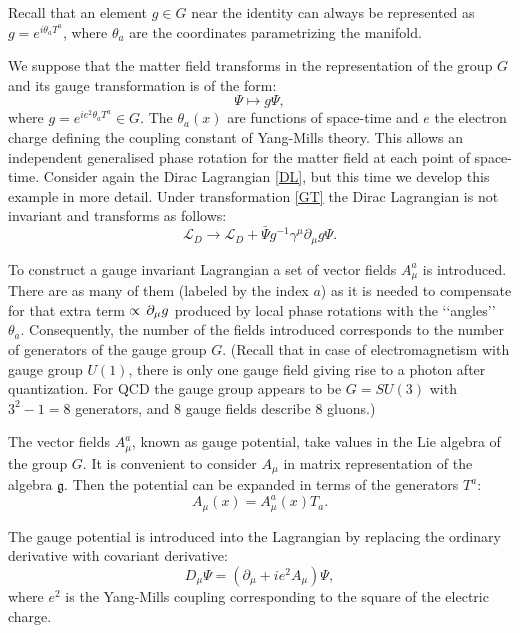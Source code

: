 \documentclass[11pt]{report}
\theoremstyle{plain}
\theoremstyle{definition}
\theoremstyle{remark}
\theoremstyle{remark}
\numberwithin{equation}{section}
\begin{document}
 Recall that an element $g \in G$ near the identity can always be represented as $g = e^{i\theta_a T^a}$, where $\theta_a$ are the coordinates parametrizing the manifold. 
 
 We suppose that the matter field transforms in the representation of the group $G$ and its gauge transformation is of the form:
 \begin{equation}\label{GT}
 \Psi \longmapsto g\Psi,
 \end{equation}
 where $g=e^{ie^2\theta_a T^a} \in G$.
 The $\theta_a(x)$ are functions of space-time and $e$ the electron charge defining the coupling constant of Yang-Mills theory. This allows an independent generalised phase rotation for the matter field at each point of space-time.
 Consider again the Dirac Lagrangian \eqref{DL}, but this time we develop this example in more detail.
 Under transformation \eqref{GT} the Dirac Lagrangian is not invariant and transforms as follows:
 \begin{equation}
 \mathcal{L}_D \longrightarrow \mathcal{L}_D + \bar{\Psi} g^{-1}\gamma^{\mu} \partial_{\mu} g \Psi.
 \end{equation}

To construct a gauge invariant Lagrangian a set of vector fields $A^a_{\mu}$ is introduced. There are as many of them (labeled by the index $a$) as it is needed to compensate for that extra term ${\rm \propto \, \partial_{\mu}} g$ produced by local phase rotations with the \lq\lq{}angles\rq\rq{} $\theta_a$. Consequently, the number of the fields introduced corresponds to the number of generators of the gauge group $G$. (Recall that in case of electromagnetism with gauge group $U(1)$, there is only one gauge field giving rise to a photon after quantization. For QCD the gauge group appears to be $G=SU(3)$ with $3^2-1=8$ generators, and 8 gauge fields describe 8 gluons.)
 
 The vector fields $A^a_{\mu}$, known as gauge potential, take values in the Lie algebra of the group $G$. It is convenient to consider $A_{\mu}$ in matrix representation of the algebra $\mathfrak{g}$. Then the potential can be expanded in terms of the generators $T^a$:
 \begin{equation}
 A_{\mu}(x) = A^a_{\mu}(x)T_a.
 \end{equation}
 
 The gauge potential is introduced into the Lagrangian by replacing the ordinary derivative with covariant derivative:
 \begin{equation}
 D_{\mu} \Psi = (\partial_{\mu} + i e^2A_{\mu})\Psi,
 \end{equation}
where $e^2$ is the Yang-Mills coupling corresponding to the square of the electric charge.
  
\end{document}

